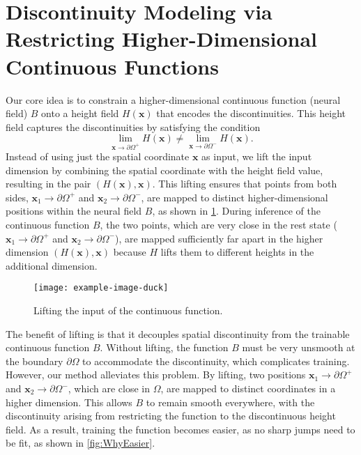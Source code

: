 \section{Discontinuity Modeling via Restricting Higher-Dimensional Continuous Functions}
\label{sec:method}
Our core idea is to constrain a higher-dimensional continuous function (neural field) $B$ onto a height field $H(\mathbf{x})$ that encodes the discontinuities. This height field captures the discontinuities by satisfying the condition
\[
\lim_{\mathbf{x} \to \partial\Omega^{+}} H(\mathbf{x}) \neq \lim_{\mathbf{x} \to \partial\Omega^{-}} H(\mathbf{x}).
\]
Instead of using just the spatial coordinate $\mathbf{x}$ as input, we lift the input dimension by combining the spatial coordinate with the height field value, resulting in the pair $\left( H(\mathbf{x}), \mathbf{x} \right)$. This lifting ensures that points from both sides, ${\mathbf{x}_1 \to \partial\Omega^{+}}$ and ${\mathbf{x}_2 \to \partial\Omega^{-}}$, are mapped to distinct higher-dimensional positions within the neural field $B$, as shown in  \ref{fig:IllusLifting}. During inference of the continuous function $B$, the two points, which are very close in the rest state (${\mathbf{x}_1 \to \partial\Omega^{+}}$ and ${\mathbf{x}_2 \to \partial\Omega^{-}}$), are mapped sufficiently far apart in the higher dimension $\left( H(\mathbf{x}), \mathbf{x} \right)$ because $H$ lifts them to different heights in the additional dimension.

\begin{figure}
\centering
\texttt{[image: example-image-duck]}
\caption{
Lifting the input of the continuous function.
} 
\label{fig:IllusLifting} 
\centering
\end{figure}

The benefit of lifting is that it decouples spatial discontinuity from the trainable continuous function $B$. Without lifting, the function $B$ must be very unsmooth at the boundary $\partial \Omega$ to accommodate the discontinuity, which complicates training. However, our method alleviates this problem. By lifting, two positions $ \mathbf{x}_1 \to \partial \Omega^{+} $ and $ \mathbf{x}_2 \to \partial \Omega^{-} $, which are close in $ \Omega $, are mapped to distinct coordinates in a higher dimension. This allows $B$ to remain smooth everywhere, with the discontinuity arising from restricting the function to the discontinuous height field. As a result, training the function becomes easier, as no sharp jumps need to be fit, as shown in  \ref{fig:WhyEasier}. 


